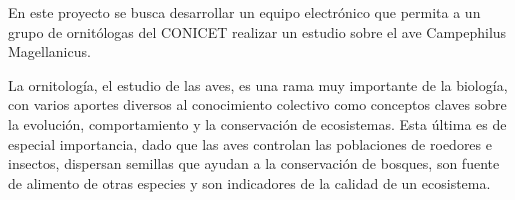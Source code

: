 

En este proyecto se busca desarrollar un equipo electrónico que permita a un grupo de ornitólogas del CONICET realizar un estudio sobre el ave Campephilus Magellanicus.%

La ornitología, el estudio de las aves, es una rama muy importante de la biología, con varios aportes diversos al conocimiento colectivo como conceptos claves sobre la evolución, comportamiento y la conservación de ecosistemas. Esta última es de especial importancia, dado que las aves controlan las poblaciones de roedores e insectos, dispersan semillas que ayudan a la conservación de bosques, son fuente de alimento de otras especies y son indicadores de la calidad de un ecosistema.


